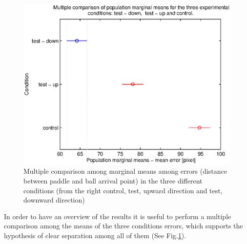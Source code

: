 \begin{figure}[tb]
	\centering
		\includegraphics [width=15cm] {fig/MultCompTTC.eps}
	\caption{Multiple comparison among marginal means among errors (distance between paddle and ball arrival point) in the three different conditions (from the right control, test, upward direction and test, downward direction)}
	\label{figMultCompTTC}
\end{figure}

In order to have an overview of the results it is useful to perform a multiple comparison among the means of the three conditions errors, which supports the hypothesis of clear separation among all of them (See Fig.\ref{figMultCompTTC}).